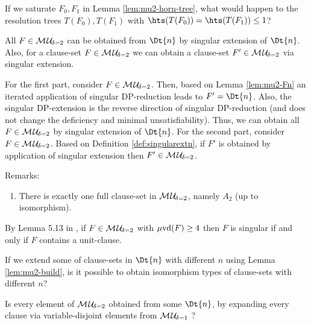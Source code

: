 \documentclass{report}
\begin{document}
\begin{quest}\label{que:mu-2-horn}
If we saturate $F_0, F_1$ in Lemma \ref{lem:mu2-horn-tree}, what would happen to the resolution trees $T(F_0), T(F_1)$ with $\hts(T(F_0))= \hts(T(F_1)) \le 1$?
\end{quest}

\begin{lem}\label{lem:mu2-build}
All $F \in \mathcal{M\hspace{0.8pt}U}_{\!\delta=2}$ can be obtained from $\Dt{n}$ by singular extension of  $\Dt{n}$. Also, for a clause-set $F \in \mathcal{M\hspace{0.8pt}U}_{\!\delta=2}$ we can obtain a clause-set $F' \in \mathcal{M\hspace{0.8pt}U}_{\!\delta=2}$ via singular extension.
\end{lem}
\begin{prf}
For the first part, consider $F \in \mathcal{M\hspace{0.8pt}U}_{\!\delta=2}$. Then, based on Lemma \ref{lem:mu2-Fn} an iterated application of singular DP-reduction leads to $F'=\Dt{n}$. Also, the singular DP-extension is the reverse direction of singular DP-reduction (and does not change the deficiency and minimal unsatisfiability). Thus, we can obtain all $F \in \mathcal{M\hspace{0.8pt}U}_{\!\delta=2}$ by singular extension of $\Dt{n}$. For the second part, consider $F \in \mathcal{M\hspace{0.8pt}U}_{\!\delta=2}$. Based on Definition \ref{def:singularextn}, if $F'$ is obtained by application of singular extension then $F' \in \mathcal{M\hspace{0.8pt}U}_{\!\delta=2}$.
\end{prf}
Remarks:
  \begin{enumerate}
  \item There is exactly one full clause-set in $\mathcal{M\hspace{0.8pt}U}_{\!\delta=2}$, namely $A_2$ (up to isomorphism).
  \end{enumerate}
  
\begin{lem}\label{lem:mu2-sing}
 By Lemma 5.13 in \cite{KullmannZhao2010Extremal}, if $F \in \mathcal{M\hspace{0.8pt}U}_{\!\delta=2}$ with $\operatorname{\mu\!\operatorname{vd}}(F) \ge 4$ then $F$ is singular if and only if $F$ contains a unit-clause.
\end{lem}  

\begin{quest}\label{que:mu-2-ism}
If we extend some of clause-sets in $\Dt{n}$ with different $n$ using Lemma \ref{lem:mu2-build}, is it possible to obtain isomorphism types of clause-sets with different $n$?
\end{quest}

\begin{quest}\label{que:mu2-from-mu1}
Is every element of $\mathcal{M\hspace{0.8pt}U}_{\!\delta=2}$ obtained from some $\Dt{n}$, by expanding every clause via variable-disjoint elements from $\mathcal{M\hspace{0.8pt}U}_{\!\delta=1}$ ?
\end{quest}
\end{document}
